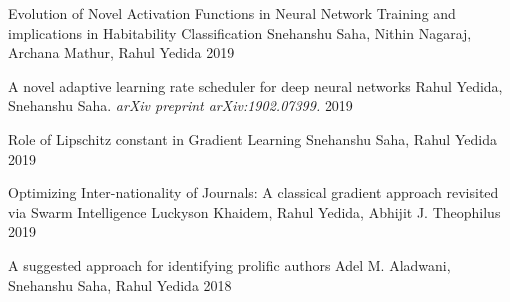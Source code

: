 

\begin{cvhonors}

  \cvhonor
    {Evolution of Novel Activation Functions in Neural Network Training and implications in Habitability Classification
}
    {Snehanshu Saha, Nithin Nagaraj, Archana Mathur, Rahul Yedida}
    {} %
    {2019} %

  \cvhonor
    {A novel adaptive learning rate scheduler for deep neural networks}
    {Rahul Yedida, Snehanshu Saha. \textit{arXiv preprint arXiv:1902.07399.}}
    {} %
    {2019} %

  \cvhonor
    {Role of Lipschitz constant in Gradient Learning}
    {Snehanshu Saha, Rahul Yedida}
    {} %
    {2019} %

  \cvhonor
    {Optimizing Inter-nationality of Journals: A classical gradient approach revisited via Swarm Intelligence}
    {Luckyson Khaidem, Rahul Yedida, Abhijit J. Theophilus}
    {} %
    {2019} %
    
  \cvhonor
    {A suggested approach for identifying prolific authors}
    {Adel M. Aladwani, Snehanshu Saha, Rahul Yedida}
    {} %
    {2018} %

\end{cvhonors}